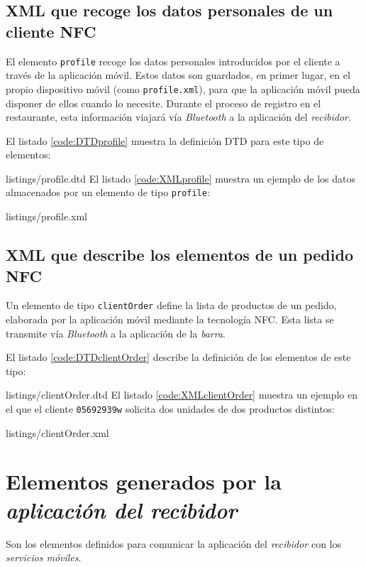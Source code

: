 \subsection{\acs{XML} que recoge los datos personales de un cliente \acs{NFC}}
El elemento \texttt{profile} recoge los datos personales introducidos por el
cliente a través de la aplicación móvil. Estos datos son guardados, en primer
lugar, en el propio dispositivo móvil (como \texttt{profile.xml}), para que la
aplicación móvil pueda disponer de ellos cuando lo necesite. Durante el
proceso de registro en el restaurante, esta información viajará vía
\emph{Bluetooth} a la aplicación del \emph{recibidor}.

El listado \ref{code:DTDprofile} muestra la definición \acs{DTD} para este 
tipo de elementos:

{listings/profile.dtd}
El listado \ref{code:XMLprofile} muestra un ejemplo de los datos almacenados
por un elemento de tipo \texttt{profile}:

{listings/profile.xml}

\subsection{\acs{XML} que describe los elementos de un pedido \acs{NFC}}
Un elemento de tipo \texttt{clientOrder} define la lista de productos de
un pedido, elaborada por la aplicación móvil mediante la tecnología \acs{NFC}.
Esta lista se transmite vía \emph{Bluetooth} a la aplicación de la
\emph{barra}.

El listado \ref{code:DTDclientOrder} describe la definición de los elementos 
de este tipo:

{listings/clientOrder.dtd}
El listado \ref{code:XMLclientOrder} muestra un ejemplo en el que el cliente
\texttt{05692939w} solicita dos unidades de dos productos distintos:

{listings/clientOrder.xml}

\section{Elementos generados por la \emph{aplicación del recibidor}}
Son los elementos definidos para comunicar la aplicación del \emph{recibidor}
con los \emph{servicios móviles}.
